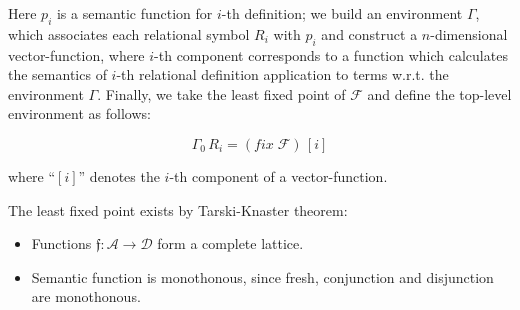 Here $p_i$ is a semantic function for $i$-th definition; we build an environment $\Gamma$, which associates each relational symbol
$R_i$ with $p_i$ and construct a $n$-dimensional vector-function, where $i$-th component corresponds to a function which
calculates the semantics of $i$-th relational definition application to terms w.r.t. the environment $\Gamma$. Finally,
we take the least fixed point of $\mathcal{F}$ and define the top-level environment as follows:

\[
\Gamma_0\,R_i=(fix\;\mathcal{F})\,[i]
\]

where ``$[i]$'' denotes the $i$-th component of a vector-function.

The least fixed point exists by Tarski-Knaster theorem:

\begin{itemize}
\item Functions $\mathfrak{f}:\mathcal{A}\to\mathcal{D}$ form a complete lattice.
\item Semantic function is monothonous, since fresh, conjunction and disjunction are monothonous.
\end{itemize}